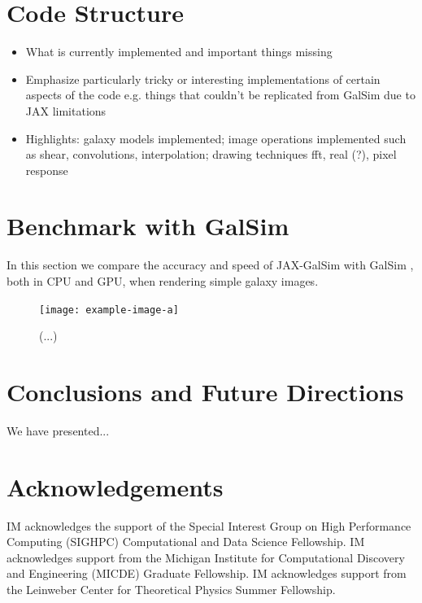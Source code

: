 \documentclass[twocolumn,twocolappendix]{openjournal}
\begin{document}
\section{Code Structure} %

\begin{itemize}
    \item What is currently implemented and important things missing
    
    \item Emphasize particularly tricky or interesting implementations of certain aspects of the code e.g. things that couldn't be replicated from GalSim due to JAX limitations
    
    \item Highlights: galaxy models implemented; image operations implemented such as shear, convolutions, interpolation; drawing techniques fft, real (?), pixel response 
\end{itemize}


\section{Benchmark with GalSim} 

In this section we compare the accuracy and speed of JAX-GalSim with GalSim \citep{galsim2015}, both in CPU and GPU, when rendering simple galaxy images.

\begin{figure}
\texttt{[image: example-image-a]}
\caption{
    (...)
    }
\label{fig:benchmark1}
\end{figure}


\section{Conclusions and Future Directions}

We have presented...


\section*{Acknowledgements} 

IM acknowledges the support of the Special Interest Group on High Performance Computing (SIGHPC) Computational and Data Science Fellowship. IM acknowledges support from the Michigan Institute for Computational Discovery and Engineering (MICDE) Graduate Fellowship. IM acknowledges support from the Leinweber Center for Theoretical Physics Summer Fellowship.
\end{document}
